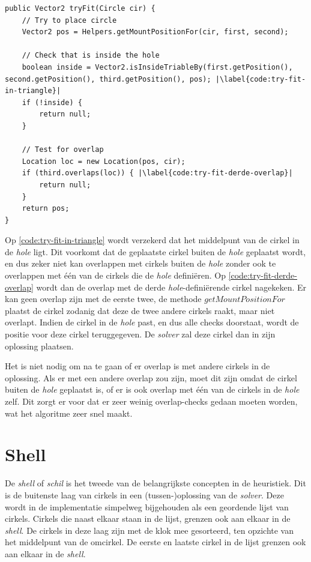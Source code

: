 \documentclass[12pt,a4paper,oneside]{book}
\begin{document}
{\begin{lstlisting}
public Vector2 tryFit(Circle cir) {
	// Try to place circle
	Vector2 pos = Helpers.getMountPositionFor(cir, first, second);

	// Check that is inside the hole
	boolean inside = Vector2.isInsideTriableBy(first.getPosition(), second.getPosition(), third.getPosition(), pos); |\label{code:try-fit-in-triangle}|
	if (!inside) {
		return null;
	}

	// Test for overlap
	Location loc = new Location(pos, cir);
	if (third.overlaps(loc)) { |\label{code:try-fit-derde-overlap}|
		return null;
	}
	return pos;
}
\end{lstlisting}

Op \autoref{code:try-fit-in-triangle} wordt verzekerd dat het middelpunt van de cirkel in de \textit{hole} ligt.
Dit voorkomt dat de geplaatste cirkel buiten de \textit{hole} geplaatst wordt, en dus zeker niet kan overlappen met cirkels buiten de \textit{hole} zonder ook te overlappen met één van de cirkels die de \textit{hole} definiëren.
Op \autoref{code:try-fit-derde-overlap} wordt dan de overlap met de derde \textit{hole}-definiërende cirkel nagekeken.
Er kan geen overlap zijn met de eerste twee, de methode $getMountPositionFor$ plaatst de cirkel zodanig dat deze de twee andere cirkels raakt, maar niet overlapt.
Indien de cirkel in de \textit{hole} past, en dus alle checks doorstaat, wordt de positie voor deze cirkel teruggegeven.
De \textit{solver} zal deze cirkel dan in zijn oplossing plaatsen.

Het is niet nodig om na te gaan of er overlap is met andere cirkels in de oplossing.
Als er met een andere overlap zou zijn, moet dit zijn omdat de cirkel buiten de \textit{hole} geplaatst is, of er is ook overlap met één van de cirkels in de \textit{hole} zelf.
Dit zorgt er voor dat er zeer weinig overlap-checks gedaan moeten worden, wat het algoritme zeer snel maakt.

\section{Shell} \label{sec:shell}

De \textit{shell} of \textit{schil} is het tweede van de belangrijkste concepten in de heuristiek.
Dit is de buitenste laag van cirkels in een (tussen-)oplossing van de \textit{solver}.
Deze wordt in de implementatie simpelweg bijgehouden als een geordende lijst van cirkels.
Cirkels die naast elkaar staan in de lijst, grenzen ook aan elkaar in de \textit{shell}.
De cirkels in deze laag zijn met de klok mee gesorteerd, ten opzichte van het middelpunt van de omcirkel.
De eerste en laatste cirkel in de lijst grenzen ook aan elkaar in de \textit{shell}. %

}
\end{document}
